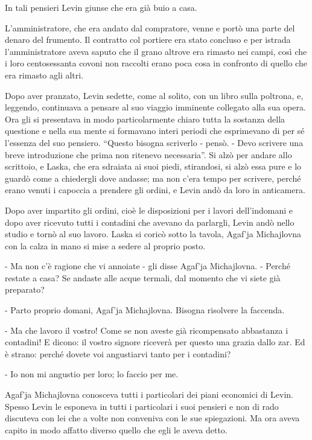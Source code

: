 In tali pensieri Levin giunse che era già buio a casa. 

L'amministratore, che era andato dal compratore, venne e portò una parte del denaro del frumento. Il contratto col portiere era stato concluso e per istrada l'amministratore aveva saputo che il grano altrove era rimasto nei campi, così che i loro centosessanta covoni non raccolti erano poca cosa in confronto di quello che era rimasto agli altri. 

Dopo aver pranzato, Levin sedette, come al solito, con un libro sulla poltrona, e, leggendo, continuava a pensare al suo viaggio imminente collegato alla sua opera. Ora gli si presentava in modo particolarmente chiaro tutta la sostanza della questione e nella sua mente si formavano interi periodi che esprimevano di per sé l'essenza del suo pensiero. ``Questo bisogna scriverlo - pensò. - Devo scrivere una breve introduzione che prima non ritenevo necessaria''. Si alzò per andare allo scrittoio, e Laska, che era sdraiata ai suoi piedi, stirandosi, si alzò essa pure e lo guardò come a chiedergli dove andasse; ma non c'era tempo per scrivere, perché erano venuti i capoccia a prendere gli ordini, e Levin andò da loro in anticamera. 

Dopo aver impartito gli ordini, cioè le disposizioni per i lavori dell'indomani e dopo aver ricevuto tutti i contadini che avevano da parlargli, Levin andò nello studio e tornò al suo lavoro. Laska si coricò sotto la tavola, Agaf'ja Michajlovna con la calza in mano si mise a sedere al proprio posto. 

- Ma non c'è ragione che vi annoiate - gli disse Agaf'ja Michajlovna. - Perché restate a casa? Se andaste alle acque termali, dal momento che vi siete già preparato? 

- Parto proprio domani, Agaf'ja Michajlovna. Bisogna risolvere la faccenda. 

- Ma che lavoro il vostro! Come se non aveste già ricompensato abbastanza i contadini! E dicono: il vostro signore riceverà per questo una grazia dallo zar. Ed è strano: perché dovete voi angustiarvi tanto per i contadini? 

- Io non mi angustio per loro; lo faccio per me. 

Agaf'ja Michajlovna conosceva tutti i particolari dei piani economici di Levin. Spesso Levin le esponeva in tutti i particolari i suoi pensieri e non di rado discuteva con lei che a volte non conveniva con le sue spiegazioni. Ma ora aveva capito in modo affatto diverso quello che egli le aveva detto. 


